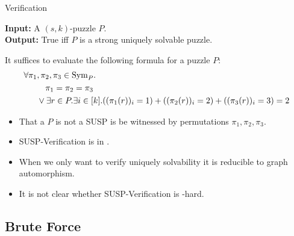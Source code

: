 \documentclass[t,10pt,
mathserif,xcolor=dvipsnames]{beamer}
\begin{document}
\begin{myframe}{Verification}

  \begin{problem}
    \textbf{Input:} A $(s,k)$-puzzle $P$. \\[1ex]
    \textbf{Output:} True iff $P$ is a strong uniquely solvable puzzle.
  \end{problem}

  It suffices to evaluate the following formula for a puzzle $P$:\\[-2ex]
  \begin{equation*}
    \begin{aligned}
      \forall \pi_1&,\pi_2, \pi_3 \in \mathrm{Sym}_{P}.\\ &~~~\pi_1 = \pi_2 = \pi_3 \\ &\vee \exists r \in P. \exists i \in [k]. ((\pi_1(r))_i = 1) + ((\pi_2(r))_i = 2) + ((\pi_3(r))_i = 3) = 2
    \end{aligned}
  \end{equation*}
  
  \begin{itemize}
  \item That a $P$ is not a SUSP is be witnessed by permutations
    $\pi_1, \pi_2, \pi_3$.
  \item SUSP-Verification is in \coNP.
  \item When we only want to verify uniquely solvability it is
    reducible to graph automorphism.
  \item It is not clear whether SUSP-Verification is \coNP-hard.
  \end{itemize}

  
\end{myframe}

\subsection{Brute Force}
\end{document}
